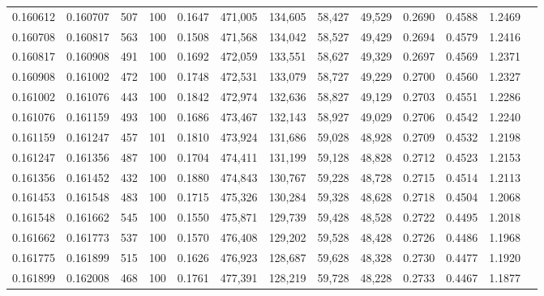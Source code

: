 \begin{tabular}{rrrrrrrrrrrrr}
0.160612 & 0.160707 &   507 & 100 &                                     0.1647 & 471,005 & 134,605 &  58,427 &  49,529 & 0.2690 & 0.4588 & 1.2469 \\
0.160708 & 0.160817 &   563 & 100 &                                     0.1508 & 471,568 & 134,042 &  58,527 &  49,429 & 0.2694 & 0.4579 & 1.2416 \\
0.160817 & 0.160908 &   491 & 100 &                                     0.1692 & 472,059 & 133,551 &  58,627 &  49,329 & 0.2697 & 0.4569 & 1.2371 \\
0.160908 & 0.161002 &   472 & 100 &                                     0.1748 & 472,531 & 133,079 &  58,727 &  49,229 & 0.2700 & 0.4560 & 1.2327 \\
0.161002 & 0.161076 &   443 & 100 &                                     0.1842 & 472,974 & 132,636 &  58,827 &  49,129 & 0.2703 & 0.4551 & 1.2286 \\
0.161076 & 0.161159 &   493 & 100 &                                     0.1686 & 473,467 & 132,143 &  58,927 &  49,029 & 0.2706 & 0.4542 & 1.2240 \\
0.161159 & 0.161247 &   457 & 101 &                                     0.1810 & 473,924 & 131,686 &  59,028 &  48,928 & 0.2709 & 0.4532 & 1.2198 \\
0.161247 & 0.161356 &   487 & 100 &                                     0.1704 & 474,411 & 131,199 &  59,128 &  48,828 & 0.2712 & 0.4523 & 1.2153 \\
0.161356 & 0.161452 &   432 & 100 &                                     0.1880 & 474,843 & 130,767 &  59,228 &  48,728 & 0.2715 & 0.4514 & 1.2113 \\
0.161453 & 0.161548 &   483 & 100 &                                     0.1715 & 475,326 & 130,284 &  59,328 &  48,628 & 0.2718 & 0.4504 & 1.2068 \\
0.161548 & 0.161662 &   545 & 100 &                                     0.1550 & 475,871 & 129,739 &  59,428 &  48,528 & 0.2722 & 0.4495 & 1.2018 \\
0.161662 & 0.161773 &   537 & 100 &                                     0.1570 & 476,408 & 129,202 &  59,528 &  48,428 & 0.2726 & 0.4486 & 1.1968 \\
0.161775 & 0.161899 &   515 & 100 &                                     0.1626 & 476,923 & 128,687 &  59,628 &  48,328 & 0.2730 & 0.4477 & 1.1920 \\
0.161899 & 0.162008 &   468 & 100 &                                     0.1761 & 477,391 & 128,219 &  59,728 &  48,228 & 0.2733 & 0.4467 & 1.1877 \\

\end{tabular}
